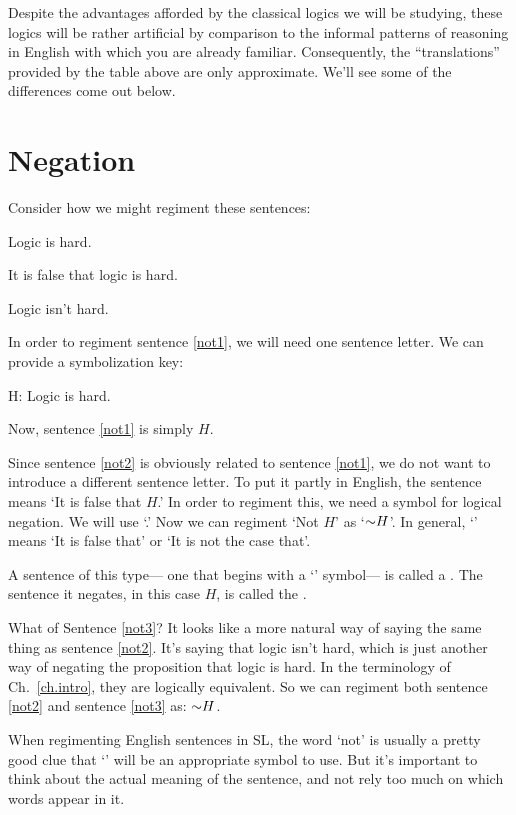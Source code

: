 Despite the advantages afforded by the classical logics we will be studying, these logics will be rather artificial by comparison to the informal patterns of reasoning in English with which you are already familiar.
Consequently, the ``translations'' provided by the table above are only approximate.
We'll see some of the differences come out below.

\section{Negation}
Consider how we might regiment these sentences:
\begin{earg}
\item[\ex{not1}] Logic is hard.
\item[\ex{not2}] It is false that logic is hard.
\item[\ex{not3}] Logic isn't hard.
\end{earg}

In order to regiment sentence \ref{not1}, we will need one sentence letter.
We can provide a symbolization key:

\begin{ekey}
\item[H:]Logic is hard.
\end{ekey}

Now, sentence \ref{not1} is simply $H$. 

Since sentence \ref{not2} is obviously related to sentence \ref{not1}, we do not want to introduce a different sentence letter.
To put it partly in English, the sentence means `It is false that $H$.'
In order to regiment this, we need a symbol for logical negation.
We will use `\enot.'
Now we can regiment `Not $H$' as `$\enot H$'.
In general, `\enot' means `It is false that' or `It is not the case that'.

A sentence of this type--- one that begins with a `\enot' symbol--- is called a .
The sentence it negates, in this case $H$, is called the .

What of Sentence \ref{not3}? It looks like a more natural  way of saying the same thing as sentence \ref{not2}.
It's saying that logic isn't hard, which is just another way of negating the proposition that logic is hard.
In the terminology of Ch.~\ref{ch.intro}, they are logically equivalent.
So we can regiment both sentence \ref{not2} and sentence \ref{not3} as: $\enot H$.

When regimenting English sentences in SL, the word `not' is usually a pretty good clue that `\enot' will be an appropriate symbol to use.
But it's important to think about the actual meaning of the sentence, and not rely too much on which words appear in it.

